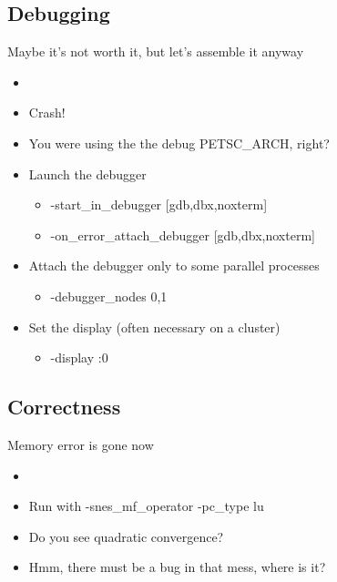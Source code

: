 \subsection{Debugging}
\begin{frame}{Maybe it's not worth it, but let's assemble it anyway}
  \begin{itemize}
  \item {}
  \item Crash!
  \item You were using the the debug PETSC\_ARCH, right?
  \item Launch the debugger
  \begin{itemize}
    \item {\kb -start\_in\_debugger  [gdb,dbx,noxterm]}
    \item {\kb -on\_error\_attach\_debugger [gdb,dbx,noxterm]}
  \end{itemize}

  \item Attach the debugger only to some parallel processes
  \begin{itemize}
    \item {\kb -debugger\_nodes 0,1}
  \end{itemize}

  \item Set the display (often necessary on a cluster)
  \begin{itemize}
    \item {\kb -display :0}
  \end{itemize}
\end{itemize}
\end{frame}  



\subsection{Correctness}

\begin{frame}{Memory error is gone now}
\begin{itemize}
  \item {}
  \item Run with {-snes\_mf\_operator -pc\_type lu}
  \item Do you see quadratic convergence?
  \item<2-> Hmm, there must be a bug in that mess, where is it?
  \end{itemize}
\end{frame}

